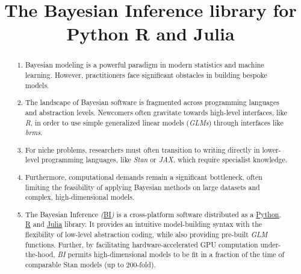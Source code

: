 \documentclass[blind,lineno,num-refs]{wiley-article}
\title{The Bayesian Inference library for Python R and Julia}
\begin{document}
\begin{frontmatter}
\maketitle

\begin{abstract}

\begin{enumerate}
  \item Bayesian modeling is a powerful paradigm in modern statistics and machine learning. However, practitioners face significant obstacles in building bespoke models.
  
  \item The landscape of Bayesian software is fragmented across programming languages and abstraction levels. Newcomers often gravitate towards high-level interfaces, like \textit{R}, in order to use simple generalized linear models (\textit{GLMs}) through interfaces like \textit{brms}.

  \item For niche problems, researchers must often transition to writing directly in lower-level programming languages, like \textit{Stan} or \textit{JAX}, which require specialist knowledge.
  
  \item  Furthermore, computational demands remain a significant bottleneck, often limiting the feasibility of applying Bayesian methods on large datasets and complex, high-dimensional models.

\item The Bayesian Inference \textit{(}\href{https://shorturl.at/CWHSD}{BI}\textit{)} is a cross-platform software distributed as a \href{https://anonymous.4open.science/r/BI-F5E4/README.md}{Python}, \href{https://anonymous.4open.science/r/BIR-4C37/}{R} and \href{https://anonymous.4open.science/r/PyBayesianInference_jl_5A2222100/README.md}{Julia} library. It provides an intuitive model-building syntax with the flexibility of low-level abstraction coding, while also providing pre-built \textit{GLM} functions. Further, by facilitating hardware-accelerated GPU computation under-the-hood, \textit{BI}  permits high-dimensional models to be fit in a fraction of the time  of comparable Stan models (up to 200-fold). 

\end{enumerate}


\end{abstract}
\end{frontmatter}
\end{document}
